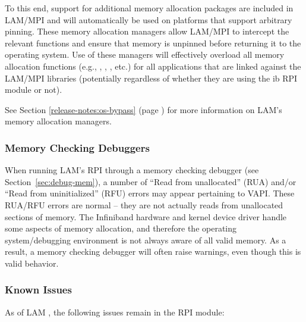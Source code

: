 To this end, support for additional memory allocation packages are
included in LAM/MPI and will automatically be used on platforms that
support arbitrary pinning.  These memory allocation managers allow
LAM/MPI to intercept the relevant functions and ensure that memory is
unpinned before returning it to the operating system.  Use of these
managers will effectively overload all memory allocation functions
(e.g., , , , etc.) for all
applications that are linked against the LAM/MPI libraries
(potentially regardless of whether they are using the ib RPI module or
not).  

See Section \ref{release-notes:os-bypass} (page
\pageref{release-notes:os-bypass}) for more information on LAM's
memory allocation managers.


\subsubsection{Memory Checking Debuggers}

When running LAM's  RPI through a memory checking debugger
(see Section~\ref{sec:debug-mem}), a number of ``Read from
unallocated'' (RUA) and/or ``Read from uninitialized'' (RFU) errors
may appear pertaining to VAPI.  These RUA/RFU errors are
normal -- they are not actually reads from unallocated sections of
memory.  The Infiniband hardware and kernel device driver handle some
aspects of memory allocation, and therefore the operating
system/debugging environment is not always aware of all valid memory.
As a result, a memory checking debugger will often raise warnings,
even though this is valid behavior.


\subsubsection{Known Issues}

As of LAM \lamversion, the following issues remain in the
 RPI module:

